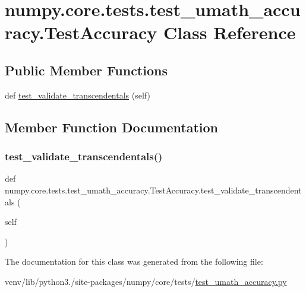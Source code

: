 \hypertarget{classnumpy_1_1core_1_1tests_1_1test__umath__accuracy_1_1TestAccuracy}{}\section{numpy.\+core.\+tests.\+test\+\_\+umath\+\_\+accuracy.\+Test\+Accuracy Class Reference}
\label{classnumpy_1_1core_1_1tests_1_1test__umath__accuracy_1_1TestAccuracy}
\subsection*{Public Member Functions}
\begin{DoxyCompactItemize}
\item 
def \hyperlink{classnumpy_1_1core_1_1tests_1_1test__umath__accuracy_1_1TestAccuracy_addc4a4c0fe43b85787ff73687e89c3e5}{test\+\_\+validate\+\_\+transcendentals} (self)
\end{DoxyCompactItemize}


\subsection{Member Function Documentation}
\mbox{\label{classnumpy_1_1core_1_1tests_1_1test__umath__accuracy_1_1TestAccuracy_addc4a4c0fe43b85787ff73687e89c3e5}} 
\subsubsection{\texorpdfstring{test\+\_\+validate\+\_\+transcendentals()}{test\_validate\_transcendentals()}}
{\footnotesize\ttfamily def numpy.\+core.\+tests.\+test\+\_\+umath\+\_\+accuracy.\+Test\+Accuracy.\+test\+\_\+validate\+\_\+transcendentals (\begin{DoxyParamCaption}\item[{}]{self }\end{DoxyParamCaption})}



The documentation for this class was generated from the following file\+:\begin{DoxyCompactItemize}
\item 
venv/lib/python3./site-\/packages/numpy/core/tests/\hyperlink{test__umath__accuracy_8py}{test\+\_\+umath\+\_\+accuracy.\+py}\end{DoxyCompactItemize}
